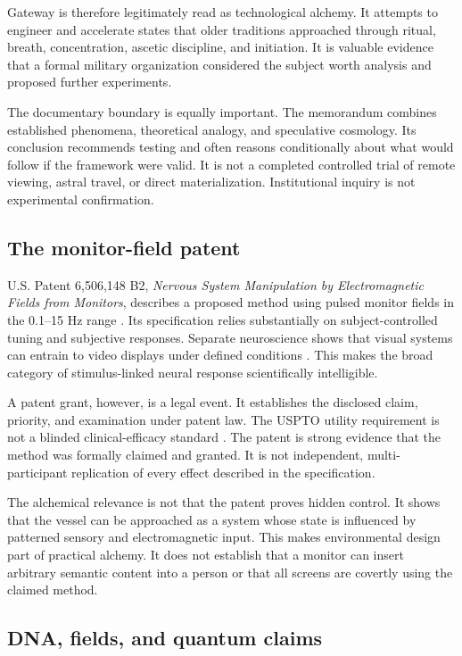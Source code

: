 \documentclass[11pt]{article}
\theoremstyle{plain}
\theoremstyle{definition}
\begin{document}
Gateway is therefore legitimately read as technological alchemy. It attempts to
engineer and accelerate states that older traditions approached through ritual,
breath, concentration, ascetic discipline, and initiation. It is valuable evidence
that a formal military organization considered the subject worth analysis and
proposed further experiments.

The documentary boundary is equally important. The memorandum combines established
phenomena, theoretical analogy, and speculative cosmology. Its conclusion recommends
testing and often reasons conditionally about what would follow if the framework were
valid. It is not a completed controlled trial of remote viewing, astral travel, or
direct materialization. Institutional inquiry is not experimental confirmation.

\subsection*{The monitor-field patent}

U.S. Patent 6,506,148 B2, \emph{Nervous System Manipulation by Electromagnetic Fields
from Monitors}, describes a proposed method using pulsed monitor fields in the
0.1--15 Hz range \citep{loos2003patent}. Its specification relies substantially on
subject-controlled tuning and subjective responses. Separate neuroscience shows that
visual systems can entrain to video displays under defined conditions
\citep{williams2004displays}. This makes the broad category of stimulus-linked neural
response scientifically intelligible.

A patent grant, however, is a legal event. It establishes the disclosed claim,
priority, and examination under patent law. The USPTO utility requirement is not a
blinded clinical-efficacy standard \citep{uspto2026utility}. The patent is strong
evidence that the method was formally claimed and granted. It is not independent,
multi-participant replication of every effect described in the specification.

The alchemical relevance is not that the patent proves hidden control. It shows that
the vessel can be approached as a system whose state is influenced by patterned
sensory and electromagnetic input. This makes environmental design part of practical
alchemy. It does not establish that a monitor can insert arbitrary semantic content
into a person or that all screens are covertly using the claimed method.

\subsection*{DNA, fields, and quantum claims}
\end{document}
